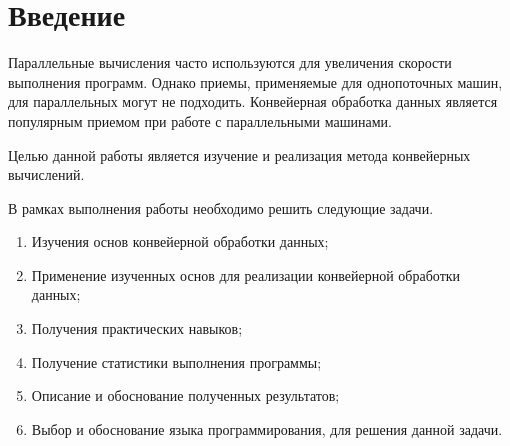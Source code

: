 \newpage
\chapter*{Введение}
Параллельные вычисления часто используются для увеличения скорости выполнения
программ. Однако приемы, применяемые для однопоточных машин, для
параллельных могут не подходить. Конвейерная обработка данных является
популярным приемом при работе с параллельными машинами.


Целью данной работы является изучение и реализация метода конвейерных вычислений.

В рамках выполнения работы необходимо решить следующие задачи.

\begin{enumerate}
	\item Изучения основ конвейерной обработки данных;
	\item Применение изученных основ для реализации конвейерной обработки данных;
	\item Получения практических навыков;
	\item Получение статистики выполнения программы;
	\item Описание и обоснование полученных результатов;
	\item Выбор и обоснование языка программирования, для решения данной задачи.
\end{enumerate}